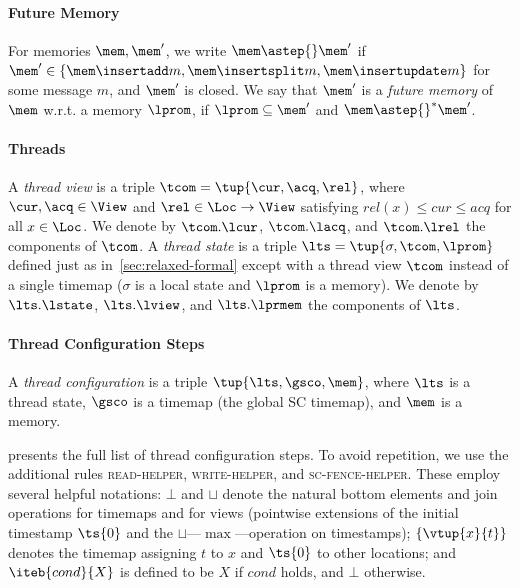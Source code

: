 \paragraph{Future Memory}
For memories $\mem,\mem'$, we write ${\mem \astep{} \mem'}$ if 
$\mem'\in\{\mem\insertadd m,\mem \insertsplit m,\mem \insertupdate m\}$
for some message $m$, and $\mem'$ is closed.
We say that $\mem'$ is a \emph{future memory} of $\mem$ w.r.t. a memory $\lprom$,
if $\lprom \subseteq \mem'$ and  $\mem \astep{}^* \mem'$.

\paragraph{Threads}
A \emph{thread view} is a triple $\tcom=\tup{\cur,\acq,\rel}$,
where $\cur,\acq\in\View$ and $\rel\in\Loc\to\View$
satisfying $rel(x) \leq cur \leq acq$ for all $x\in\Loc$.
We denote by $\tcom.\lcur$, $\tcom.\lacq$, and $\tcom.\lrel$ the components of $\tcom$.
A \emph{thread state} is a triple $\lts=\tup{\sigma,\tcom,\lprom}$
defined just as in~\cref{sec:relaxed-formal} except with a thread view $\tcom$ instead of
a single timemap ($\sigma$ is a local state and $\lprom$ is a memory).
We denote by $\lts.\lstate$, $\lts.\lview$, and $\lts.\lprmem$ the components of $\lts$.

\paragraph{Thread Configuration Steps}
A \emph{thread configuration} is a triple $\tup{\lts,\gsco,\mem}$,
where $\lts$ is a thread state, $\gsco$ is a timemap (the global SC timemap), and $\mem$ is a memory.

 presents the full list of thread configuration steps.
To avoid repetition, we use the additional 
rules \textsc{read-helper}, \textsc{write-helper}, and \textsc{sc-fence-helper}.
These employ several helpful notations:
$\bot$ and $\sqcup$ denote the natural bottom elements and join operations for timemaps and for views 
(pointwise extensions of the initial timestamp $\ts{0}$ and the $\sqcup$---\ie $\max$---operation on timestamps);
$\{\vtup{x}{t}\}$ denotes the timemap assigning $t$ to $x$ and $\ts{0}$ to other locations;
and $\iteb{cond}{X}$ is defined to be $X$ if $cond$ holds, 
and $\bot$ otherwise.


